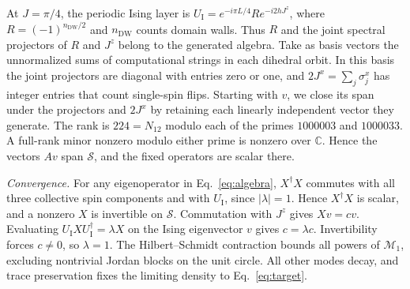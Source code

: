\documentclass[aps,prl,reprint,amsmath,amssymb,floatfix,superscriptaddress]{revtex4-2}
\newcommand{\UI}{U_{\mathrm I}}
\begin{document}
At $J=\pi/4$, the periodic Ising layer is $\UI=e^{-i\pi L/4}R e^{-i2hJ^z}$, where $R=(-1)^{n_{\mathrm{DW}}/2}$ and $n_{\mathrm{DW}}$ counts domain walls. Thus $R$ and the joint spectral projectors of $R$ and $J^z$ belong to the generated algebra. Take as basis vectors the unnormalized sums of computational strings in each dihedral orbit. In this basis the joint projectors are diagonal with entries zero or one, and $2J^x=\sum_j\sigma_j^x$ has integer entries that count single-spin flips. Starting with $v$, we close its span under the projectors and $2J^x$ by retaining each linearly independent vector they generate. The rank is $224=N_{12}$ modulo each of the primes $1000003$ and $1000033$. A full-rank minor nonzero modulo either prime is nonzero over $\mathbb C$. Hence the vectors $Av$ span $\mathcal S$, and the fixed operators are scalar there.

\emph{Convergence.} For any eigenoperator in Eq.~\eqref{eq:algebra}, $X^\dagger X$ commutes with all three collective spin components and with $\UI$, since $|\lambda|=1$. Hence $X^\dagger X$ is scalar, and a nonzero $X$ is invertible on $\mathcal S$. Commutation with $J^z$ gives $Xv=cv$. Evaluating $\UI X\UI^\dagger=\lambda X$ on the Ising eigenvector $v$ gives $c=\lambda c$. Invertibility forces $c\ne0$, so $\lambda=1$. The Hilbert--Schmidt contraction bounds all powers of $\mathcal M_1$, excluding nontrivial Jordan blocks on the unit circle. All other modes decay, and trace preservation fixes the limiting density to Eq.~\eqref{eq:target}.
\end{document}
